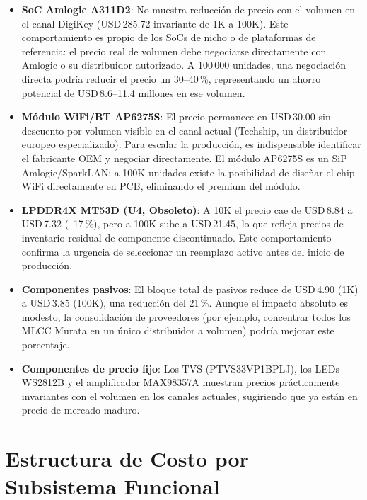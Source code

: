 \begin{itemize}
  \item \textbf{SoC Amlogic A311D2}: No muestra reducción de precio con
    el volumen en el canal DigiKey (USD\,285.72 invariante de 1K a 100K).
    Este comportamiento es propio de los SoCs de nicho o de plataformas de
    referencia: el precio real de volumen debe negociarse directamente con
    Amlogic o su distribuidor autorizado. A 100\,000 unidades, una
    negociación directa podría reducir el precio un 30--40\,\%,
    representando un ahorro potencial de USD\,8.6--11.4 millones en ese
    volumen.

  \item \textbf{Módulo WiFi/BT AP6275S}: El precio permanece en USD\,30.00
    sin descuento por volumen visible en el canal actual (Techship, un
    distribuidor europeo especializado). Para escalar la producción, es
    indispensable identificar el fabricante OEM y negociar directamente.
    El módulo AP6275S es un SiP Amlogic/SparkLAN; a 100K unidades existe
    la posibilidad de diseñar el chip WiFi directamente en PCB, eliminando
    el premium del módulo.

  \item \textbf{LPDDR4X MT53D (U4, Obsoleto)}: A 10K el precio cae de
    USD\,8.84 a USD\,7.32 (--17\,\%), pero a 100K sube a USD\,21.45, lo
    que refleja precios de inventario residual de componente discontinuado.
    Este comportamiento confirma la urgencia de seleccionar un reemplazo
    activo antes del inicio de producción.

  \item \textbf{Componentes pasivos}: El bloque total de pasivos reduce
    de USD\,4.90 (1K) a USD\,3.85 (100K), una reducción del 21\,\%.
    Aunque el impacto absoluto es modesto, la consolidación de proveedores
    (por ejemplo, concentrar todos los MLCC Murata en un único distribuidor
    a volumen) podría mejorar este porcentaje.

  \item \textbf{Componentes de precio fijo}: Los TVS (PTVS33VP1BPLJ),
    los LEDs WS2812B y el amplificador MAX98357A muestran precios
    prácticamente invariantes con el volumen en los canales actuales,
    sugiriendo que ya están en precio de mercado maduro.
\end{itemize}

\section{Estructura de Costo por Subsistema Funcional}
\label{sec:cost_subsistemas}

